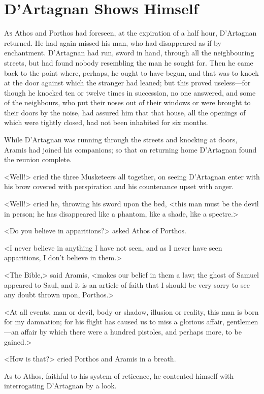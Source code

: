 
\chapter{D'Artagnan Shows Himself}

\lettrine{A}{s} Athos and Porthos had foreseen, at the expiration of a half hour, D'Artagnan returned. He had again missed his man, who had disappeared as if by enchantment. D'Artagnan had run, sword in hand, through all the neighbouring streets, but had found nobody resembling the man he sought for. Then he came back to the point where, perhaps, he ought to have begun, and that was to knock at the door against which the stranger had leaned; but this proved useless—for though he knocked ten or twelve times in succession, no one answered, and some of the neighbours, who put their noses out of their windows or were brought to their doors by the noise, had assured him that that house, all the openings of which were tightly closed, had not been inhabited for six months. 

While D'Artagnan was running through the streets and knocking at doors, Aramis had joined his companions; so that on returning home D'Artagnan found the reunion complete. 

<Well!> cried the three Musketeers all together, on seeing D'Artagnan enter with his brow covered with perspiration and his countenance upset with anger. 

<Well!> cried he, throwing his sword upon the bed, <this man must be the devil in person; he has disappeared like a phantom, like a shade, like a spectre.> 

<Do you believe in apparitions?> asked Athos of Porthos. 

<I never believe in anything I have not seen, and as I never have seen apparitions, I don't believe in them.> 

<The Bible,> said Aramis, <makes our belief in them a law; the ghost of Samuel appeared to Saul, and it is an article of faith that I should be very sorry to see any doubt thrown upon, Porthos.> 

<At all events, man or devil, body or shadow, illusion or reality, this man is born for my damnation; for his flight has caused us to miss a glorious affair, gentlemen—an affair by which there were a hundred pistoles, and perhaps more, to be gained.> 

<How is that?> cried Porthos and Aramis in a breath. 

As to Athos, faithful to his system of reticence, he contented himself with interrogating D'Artagnan by a look. 

